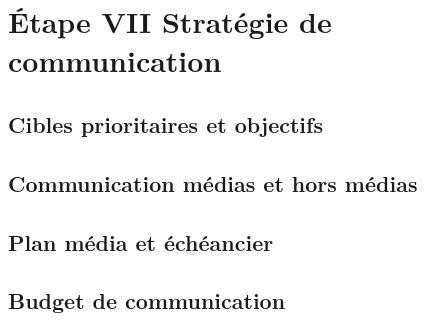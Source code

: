 \section{Étape VII \textendash{} Stratégie de communication}

\subsection{Cibles prioritaires et objectifs}
\subsection{Communication médias et hors médias}
\subsection{Plan média et échéancier}
\subsection{Budget de communication}
